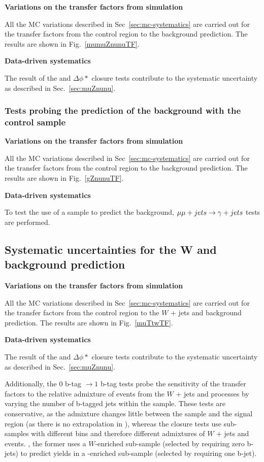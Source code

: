 {\bf Variations on the transfer factors from simulation}

All the MC variations described in Sec~\ref{sec:mc-systematics} are
carried out for the transfer factors from the \mmj control region to
the \znunu background prediction. The results are shown in
Fig.~\ref{mumuZnunuTF}.

{\bf Data-driven systematics}

The result of the \alphat and $\Delta\phi *$ closure tests contribute
to the systematic uncertainty as described in Sec.~\ref{sec:muZnunu}.

\subsubsection{Tests probing the prediction of the \znunu
background with the \gj control sample}

{\bf Variations on the transfer factors from simulation}

All the MC variations described in Sec~\ref{sec:mc-systematics} are
carried out for the transfer factors from the \gj control region to
the \znunu background prediction. The results are shown in
Fig.~\ref{gZnunuTF}.

{\bf Data-driven systematics}

To test the use of a \gj sample to predict the \zinv background, $\mmj \rightarrow \gj$
tests are performed.

\subsection{Systematic uncertainties for the W and \ttbar background
prediction}

{\bf Variations on the transfer factors from simulation}

All the MC variations described in Sec~\ref{sec:mc-systematics} are
carried out for the transfer factors from the \mj control region to
the $W$ + jets and \ttbar background prediction. The results are shown 
in Fig.~\ref{muTtwTF}.

{\bf Data-driven systematics}

The result of the \alphat and $\Delta\phi *$ closure tests contribute
to the systematic uncertainty as described in Sec.~\ref{sec:muZnunu}.

Additionally, the $0$ b-tag $\rightarrow1$ b-tag
tests probe the sensitivity of the transfer factors to the relative
admixture of events from the $W$ + jets and \ttbar processes by
varying the number of b-tagged jets within the \mj sample. These tests
are conservative, as the admixture changes little between the \mj
sample and the signal region (as there is no extrapolation in \nb),
whereas the closure tests use sub-samples with different \nb bins and
therefore different admixtures of $W$ + jets and \ttbar events. \eg,
the former uses a $W$-enriched sub-sample (selected by requiring zero
b-jets) to predict yields in a \ttbar-enriched sub-sample (selected by
requiring one b-jet).

